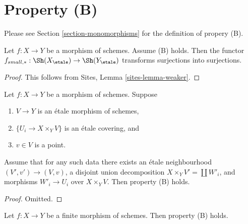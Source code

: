 \section{Property (B)}
\label{section-B}

\noindent
Please see Section \ref{section-monomorphisms} for the definition of propery
(B).

\begin{lemma}
\label{lemma-property-B-implies}
Let $f : X \to Y$ be a morphism of schemes. Assume (B) holds.
Then the functor
$f_{small, *} :
\Sh(X_\etale)
\to
\Sh(Y_\etale)$
transforms surjections into surjections.
\end{lemma}

\begin{proof}
This follows from
Sites, Lemma \ref{sites-lemma-weaker}.
\end{proof}

\begin{lemma}
\label{lemma-simplify-B}
Let $f : X \to Y$ be a morphism of schemes. Suppose
\begin{enumerate}
\item $V \to Y$ is an \'etale morphism of schemes,
\item $\{U_i \to X \times_Y V\}$ is an \'etale covering, and
\item $v \in V$ is a point.
\end{enumerate}
Assume that for any such data there exists an \'etale neighbourhood
$(V', v') \to (V, v)$, a disjoint union decomposition
$X \times_Y V' = \coprod W'_i$, and morphisms $W'_i \to U_i$
over $X \times_Y V$. Then property (B) holds.
\end{lemma}

\begin{proof}
Omitted.
\end{proof}

\begin{lemma}
\label{lemma-finite-B}
Let $f : X \to Y$ be a finite morphism of schemes.
Then property (B) holds.
\end{lemma}

